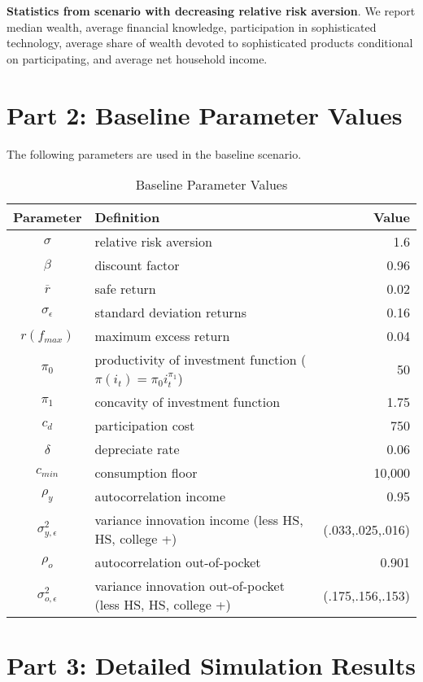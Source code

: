 \documentclass[10pt, oneside]{article}   	%
\begin{document}
\begin{table}[H]
\centering

\caption{\textbf{Statistics from scenario with decreasing relative risk aversion}. We report median wealth, average financial knowledge, participation in sophisticated technology, average share of wealth devoted to sophisticated products conditional on participating, and average net household income.}
\end{table}

\pagebreak

\section*{Part 2: Baseline Parameter Values}

The following parameters are used in the baseline scenario. 

\begin{table}[H]
\centering
\begin{tabular}{clr}
\hline \hline
Parameter & Definition & Value \\
\hline 
$\sigma$ & relative risk aversion & 1.6\tabularnewline
$\beta$ & discount factor & 0.96\tabularnewline
$\overline{r}$ & safe return & 0.02\tabularnewline
$\sigma_{\epsilon}$ & standard deviation returns & 0.16 \tabularnewline
$r(f_{max})$ & maximum excess return & 0.04\tabularnewline
$\pi_{0}$ & productivity of investment function ($\pi(i_t) = \pi_0 i_t ^ {\pi_1}$) & 50\tabularnewline
$\pi_{1}$ & concavity of investment function & 1.75\tabularnewline
$c_{d}$ & participation cost & 750\tabularnewline
$\delta$ & depreciate rate & 0.06\tabularnewline
$c_{min}$ & consumption floor & 10,000\tabularnewline
$\rho_{y}$ & autocorrelation income & 0.95 \tabularnewline
$\sigma_{y,\epsilon}^2$ & variance innovation income (less HS, HS, college +) & (.033,.025,.016) \tabularnewline
$\rho_{o}$ & autocorrelation out-of-pocket & 0.901 \tabularnewline
$\sigma_{o,\epsilon}^2$ & variance innovation out-of-pocket (less HS, HS, college +) & (.175,.156,.153) \tabularnewline

\hline \hline
\end{tabular}
\caption{Baseline Parameter Values}
\end{table}


\pagebreak

\section*{Part 3: Detailed Simulation Results}
\end{document}

